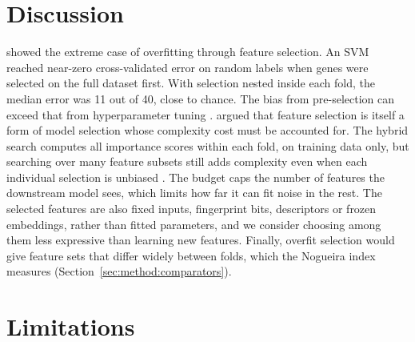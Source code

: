 \section{Discussion}

\citet{Ambroise2002} showed the extreme case of overfitting through feature selection. An SVM reached near-zero cross-validated error on random labels when genes were selected on the full dataset first. With selection nested inside each fold, the median error was 11 out of 40, close to chance. The bias from pre-selection can exceed that from hyperparameter tuning \citep{Vabalas2019}. \citet{Cawley2010} argued that feature selection is itself a form of model selection whose complexity cost must be accounted for. The hybrid search computes all importance scores within each fold, on training data only, but searching over many feature subsets still adds complexity even when each individual selection is unbiased \citep{Tibshirani2015}. The budget caps the number of features the downstream model sees, which limits how far it can fit noise in the rest. The selected features are also fixed inputs, fingerprint bits, descriptors or frozen embeddings, rather than fitted parameters, and we consider choosing among them less expressive than learning new features. Finally, overfit selection would give feature sets that differ widely between folds, which the Nogueira index measures (Section~\ref{sec:method:comparators}).

\section{Limitations}\label{sec:method:limitations}

